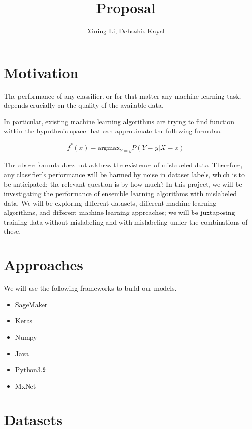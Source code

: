 \documentclass{article}
\author{Xining Li, Debashis Kayal}
\title {Proposal}
\begin{document}
\maketitle

\section{Motivation}

The performance of any classifier, or for that matter any machine learning task, depends crucially on the quality of the available data. 


In particular, existing machine learning algorithms are trying to find function within the hypothesis space that can approximate the following formulas. 

\begin{equation}
    f^*(x) = {\mathrm {argmax}}_{Y=y} P (Y=y|X=x)
\end{equation}

The above formula does not address the existence of mislabeled data. Therefore, any classifier's performance will be harmed by noise in dataset labels, which is to be anticipated; the relevant question is by how much? 
In this project, we will be investigating the performance of ensemble learning algorithms with mislabeled data. We will be exploring different datasets, different machine learning algorithms, and different machine learning approaches; we will be juxtaposing training data without mislabeling and with mislabeling under the combinations of these. 

\section{Approaches}

We will use the following frameworks to build our models. 

\begin{itemize}
    \item SageMaker
    \item Keras
    \item Numpy
    \item Java
	\item Python3.9    
    \item MxNet
\end{itemize}

\section{Datasets}
\end{document}
